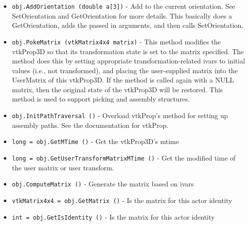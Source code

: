\begin{itemize}
\item  \verb|obj.AddOrientation (double a[3])| -  Add to the current orientation. See SetOrientation and
 GetOrientation for more details. This basically does a
 GetOrientation, adds the passed in arguments, and then calls
 SetOrientation.

\item  \verb|obj.PokeMatrix (vtkMatrix4x4 matrix)| -  This method modifies the vtkProp3D so that its transformation
 state is set to the matrix specified. The method does this by
 setting appropriate transformation-related ivars to initial
 values (i.e., not transformed), and placing the user-supplied
 matrix into the UserMatrix of this vtkProp3D. If the method is
 called again with a NULL matrix, then the original state of the
 vtkProp3D will be restored. This method is used to support
 picking and assembly structures.

\item  \verb|obj.InitPathTraversal ()| -  Overload vtkProp's method for setting up assembly paths. See
 the documentation for vtkProp.

\item  \verb|long = obj.GetMTime ()| -  Get the vtkProp3D's mtime 

\item  \verb|long = obj.GetUserTransformMatrixMTime ()| -  Get the modified time of the user matrix or user transform.

\item  \verb|obj.ComputeMatrix ()| -  Generate the matrix based on ivars

\item  \verb|vtkMatrix4x4 = obj.GetMatrix ()| -  Is the matrix for this actor identity

\item  \verb|int = obj.GetIsIdentity ()| -  Is the matrix for this actor identity

\end{itemize}
